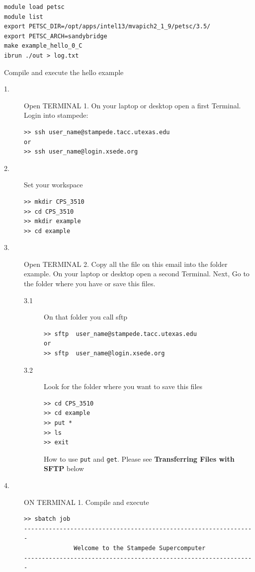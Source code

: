 \documentclass{article}
\begin{document}
\begin{description}
\begin{verbatim}
module load petsc
module list
export PETSC_DIR=/opt/apps/intel13/mvapich2_1_9/petsc/3.5/
export PETSC_ARCH=sandybridge
make example_hello_0_C
ibrun ./out > log.txt
\end{verbatim}
\normalsize
\end{description}
Compile and execute the hello example
\begin{description}
\item [1.] Open TERMINAL 1. On your laptop or desktop open a first Terminal. Login into stampede:
\scriptsize
\begin{verbatim}
>> ssh user_name@stampede.tacc.utexas.edu
or
>> ssh user_name@login.xsede.org
\end{verbatim}
\normalsize
\item [2.] Set your workspace
\scriptsize
\begin{verbatim}
>> mkdir CPS_3510
>> cd CPS_3510
>> mkdir example
>> cd example
\end{verbatim}
\normalsize
\item [3.] Open TERMINAL 2.  Copy all the file on this email into the folder example.
On your laptop or desktop open a second Terminal. Next, Go to the folder where you have or save this files. 
\begin{description}
 \item [3.1] On that folder you call sftp
\scriptsize
\begin{verbatim}
>> sftp  user_name@stampede.tacc.utexas.edu
or
>> sftp  user_name@login.xsede.org
\end{verbatim}
\normalsize
\item [3.2] Look for the folder where you want to save this files
\scriptsize
\begin{verbatim}
>> cd CPS_3510
>> cd example
>> put *
>> ls
>> exit
\end{verbatim}
\normalsize
How to use \verb+put+ and \verb+get+. Please see \textbf{Transferring Files with SFTP} below
\end{description}
\item [4.] ON TERMINAL 1.  Compile and execute
\scriptsize
\begin{verbatim}
>> sbatch job
-----------------------------------------------------------------
              Welcome to the Stampede Supercomputer              
-----------------------------------------------------------------


\end{verbatim}
\end{description}
\end{document}
